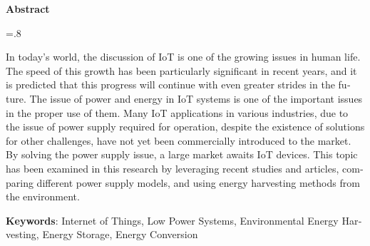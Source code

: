 


\pagestyle{empty}

\begin{latin}

\begin{center}
\textbf{Abstract}
\end{center}
\baselineskip=.8\baselineskip

In today's world, the discussion of IoT is one of the growing issues in human life. The speed of this growth has been particularly significant in recent years, and it is predicted that this progress will continue with even greater strides in the future. The issue of power and energy in IoT systems is one of the important issues in the proper use of them. Many IoT applications in various industries, due to the issue of power supply required for operation, despite the existence of solutions for other challenges, have not yet been commercially introduced to the market. By solving the power supply issue, a large market awaits IoT devices. This topic has been examined in this research by leveraging recent studies and articles, comparing different power supply models, and using energy harvesting methods from the environment.


\bigskip\noindent\textbf{Keywords}:
Internet of Things, Low Power Systems, Environmental Energy Harvesting, Energy Storage, Energy Conversion

\end{latin}
